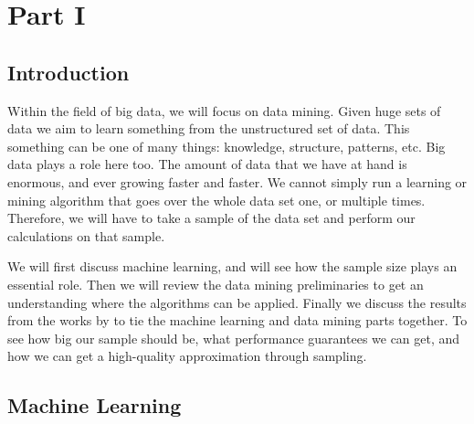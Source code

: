 \documentclass[../main.tex]{subfiles}
\begin{document}

\section*{Part I}
\setcounter{section}{1}
\setcounter{subsection}{0}

\subsection{Introduction}
\label{sec:I_intro}

Within the field of big data, we will focus on data mining.
Given huge sets of data we aim to learn something from the unstructured set of data.
This something can be one of many things: knowledge, structure, patterns, etc.
Big data plays a role here too. The amount of data that we have at hand is enormous, and ever growing faster and faster.
We cannot simply run a learning or mining algorithm that goes over the whole data set one, or multiple times.
Therefore, we will have to take a sample of the data set and perform our calculations on that sample.

We will first discuss machine learning, and will see how the sample size plays an essential role.
Then we will review the data mining preliminaries to get an understanding where the algorithms can be applied.
Finally we discuss the results from the works by \citeauthor{Riondato2012} \cite{Riondato2012, Riondato2015} to tie the machine learning and data mining parts together.
To see how big our sample should be, what performance guarantees we can get, and how we can get a high-quality approximation through sampling.

\subsection{Machine Learning}
\label{sec:I_machine_learning}
\end{document}
